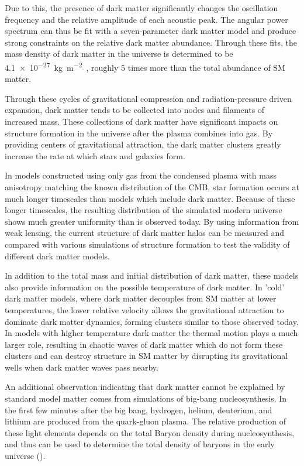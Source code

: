Due to this, the presence of dark matter significantly changes the oscillation frequency and the relative amplitude of each acoustic peak.
The angular power spectrum can thus be fit with a seven-parameter dark matter model and produce strong constraints on the relative dark matter abundance.
Through these fits, the mass density of dark matter in the universe is determined to be \SI{4.1e-27}{\kilo\gram\per\meter\squared}~\cite{PlanckCMB}, roughly 5 times more than the total abundance of SM matter.

Through these cycles of gravitational compression and radiation-pressure driven expansion, dark matter tends to be collected into nodes and filaments of increased mass. 
These collections of dark matter have significant impacts on structure formation in the universe after the plasma combines into gas.
By providing centers of gravitational attraction, the dark matter clusters greatly increase the rate at which stars and galaxies form.

In models constructed using only gas from the condensed plasma with mass anisotropy matching the known distribution of the CMB, star formation occurs at much longer timescales than models which include dark matter.
Because of these longer timescales, the resulting distribution of the simulated modern universe shows much greater uniformity than is observed today. 
By using information from weak lensing, the current structure of dark matter halos can be measured and compared with various simulations of structure formation to test the validity of different dark matter models.

In addition to the total mass and initial distribution of dark matter, these models also provide information on the possible temperature of dark matter.
In 'cold' dark matter models, where dark matter decouples from SM matter at lower temperatures, the lower relative velocity allows the gravitational attraction to dominate dark matter dynamics, forming clusters similar to those observed today.
In models with higher temperature dark matter the thermal motion plays a much larger role, resulting in chaotic waves of dark matter which do not form these clusters and can destroy structure in SM matter by disrupting its gravitational wells when dark matter waves pass nearby.

An additional observation indicating that dark matter cannot be explained by standard model matter comes from simulations of big-bang nucleosynthesis. 
In the first few minutes after the big bang, hydrogen, helium, deuterium, and lithium are produced from the quark-gluon plasma. 
The relative production of these light elements depends on the total Baryon density during nucleosynthesis, and thus can be used to determine the total density of baryons in the early universe ().

